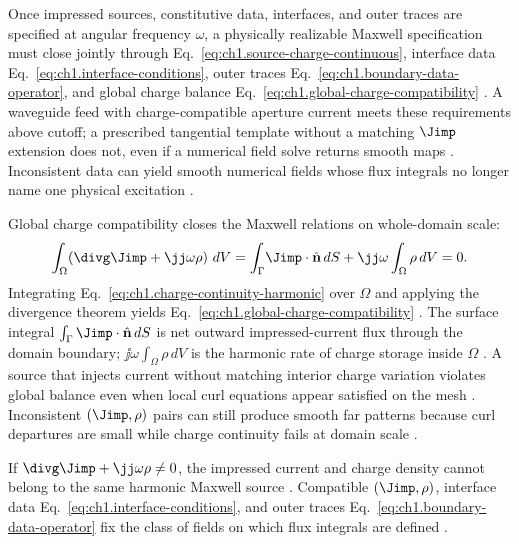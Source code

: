Once impressed sources, constitutive data, interfaces, and outer traces are specified at angular frequency $\omega$, a physically realizable Maxwell specification must close jointly through Eq.~\eqref{eq:ch1.source-charge-continuous}, interface data Eq.~\eqref{eq:ch1.interface-conditions}, outer traces Eq.~\eqref{eq:ch1.boundary-data-operator}, and global charge balance Eq.~\eqref{eq:ch1.global-charge-compatibility} \cite{maxwell1873,stratton1941}. A waveguide feed with charge-compatible aperture current meets these requirements above cutoff; a prescribed tangential template without a matching $\Jimp$ extension does not, even if a numerical field solve returns smooth maps \cite{collin2001}. Inconsistent data can yield smooth numerical fields whose flux integrals no longer name one physical excitation \cite{stratton1941}.

Global charge compatibility closes the Maxwell relations on whole-domain scale:
\begin{equation}
\label{eq:ch1.global-charge-compatibility}
\int_{\Omega}\!\left(\divg\Jimp+\jj\omega\rho\right)\,dV
=\int_{\Gamma}\!\Jimp\cdot\hat{\mathbf{n}}\,dS+\jj\omega\int_{\Omega}\rho\,dV=0.
\end{equation}
Integrating Eq.~\eqref{eq:ch1.charge-continuity-harmonic} over $\Omega$ and applying the divergence theorem yields Eq.~\eqref{eq:ch1.global-charge-compatibility} \cite{maxwell1873}. The surface integral $\int_{\Gamma}\Jimp\cdot\hat{\mathbf{n}}\,dS$ is net outward impressed-current flux through the domain boundary; $\jj\omega\int_{\Omega}\rho\,dV$ is the harmonic rate of charge storage inside $\Omega$ \cite{stratton1941}. A source that injects current without matching interior charge variation violates global balance even when local curl equations appear satisfied on the mesh \cite{harrington2001}. Inconsistent $(\Jimp,\rho)$ pairs can still produce smooth far patterns because curl departures are small while charge continuity fails at domain scale \cite{hansen1988}.

\label{prop:ch1.source-boundary-compatibility}
If $\divg\Jimp+\jj\omega\rho\neq 0$, the impressed current and charge density cannot belong to the same harmonic Maxwell source \cite{maxwell1873,stratton1941}. Compatible $(\Jimp,\rho)$, interface data Eq.~\eqref{eq:ch1.interface-conditions}, and outer traces Eq.~\eqref{eq:ch1.boundary-data-operator} fix the class of fields on which flux integrals are defined \cite{stratton1941}.

